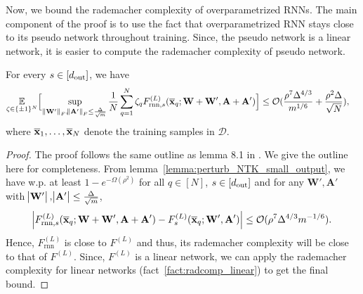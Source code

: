 Now, we bound the rademacher complexity of overparametrized RNNs.  The main component of the proof is to use the fact that overparametrized RNN stays close to its pseudo network throughout training. Since, the pseudo network is a linear network, it is easier to compute the rademacher complexity of pseudo network.
\begin{lemma}\label{lem:radcomp}
   For every $s \in [d_{\mathrm{out}} ]$, we have 
   \begin{align*}
      \underset{\zeta \in \{\pm 1\}^{N}}{\mathbb{E}} &\Big[\sup_{\norm{\mathbf{W}'}_F, \norm{\mathbf{A}'}_F \le \frac{\Delta}{\sqrt{m}}} \frac{1}{N} \sum_{q=1}^{N}  \zeta_q F^{(L)}_{\mathrm{rnn}, s} (\overline{\mathbf{x}}_q; \mathbf{W}+\mathbf{W}', \mathbf{A} + \mathbf{A}' ) \Big]  \le \mathcal{O}(\frac{\rho^7 \Delta^{4/3}}{m^{1/6}} + \frac{\rho^2 \Delta}{\sqrt{N}}),
   \end{align*}
   where $\overline{\mathbf{x}}_1, \ldots, \overline{\mathbf{x}}_N$ denote the training samples in $\mathcal{D}$.
\end{lemma}
\begin{proof}
    The proof follows the same outline as lemma 8.1 in \cite{allen2019can}. We give the outline here for completeness. From lemma~\ref{lemma:perturb_NTK_small_output}, we have w.p. at least $1 - e^{-\Omega(\rho^2)}$ for all $q \in [N]$, $s \in [d_{\mathrm{out}} ]$ and for any $\mathbf{W}', \mathbf{A}'$ with $\abs{\mathbf{W}'}, \abs{\mathbf{A}'} \le \frac{\Delta}{\sqrt{m}}$,
    \begin{align*}
        \abs{F^{(L)}_{\mathrm{rnn}, s} (\overline{\mathbf{x}}_q; \mathbf{W}+\mathbf{W}', \mathbf{A} + \mathbf{A}') -  F^{(L)}_{s} (\overline{\mathbf{x}}_q; \mathbf{W}', \mathbf{A}') } \le \mathcal{O}(\rho^7 \Delta^{4/3} m^{-1/6}).
    \end{align*}
    Hence, $F_{\mathrm{rnn}}^{(L)}$ is close to $F^{(L)}$ and thus, its rademacher complexity will be close to that of $F^{(L)}$.  Since, $F^{(L)}$ is a linear network, we can apply the rademacher complexity for linear networks (fact~\ref{fact:radcomp_linear}) to get the final bound.
\end{proof}

